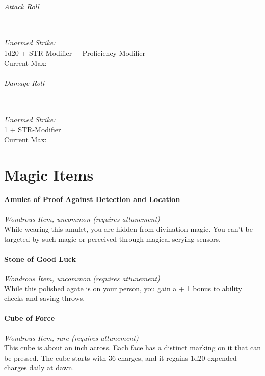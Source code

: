 \documentclass[letterpaper,openany,oneside,twocolumn]{book}
\begin{document}
\paragraph*{Attack Roll}\hfill\\
\underline{\textit{Unarmed Strike:}}\\
1d20 + STR-Modifier + Proficiency Modifier\\
\indent Current Max: 
\paragraph*{Damage Roll}\hfill\\
\underline{\textit{Unarmed Strike:}}\\
1 + STR-Modifier\\
\indent Current Max: 

\part*{Magic Items}

\subsection*{Amulet of Proof Against Detection and Location}
\textit{Wondrous Item, uncommon (requires attunement)}\\
While wearing this amulet, you are hidden from divination magic. You can't be targeted by such magic or perceived through magical scrying sensors.

\subsection*{Stone of Good Luck}
\textit{Wondrous Item, uncommon (requires attunement)}\\
While this polished agate is on your person, you gain a + 1 bonus to ability checks and saving throws.

\subsection*{Cube of Force}
\textit{Wondrous Item, rare (requires attunement)}\\
This cube is about an inch across. Each face has a distinct marking on it that can be pressed. The cube starts with 36 charges, and it regains 1d20 expended charges daily at dawn.
\end{document}
